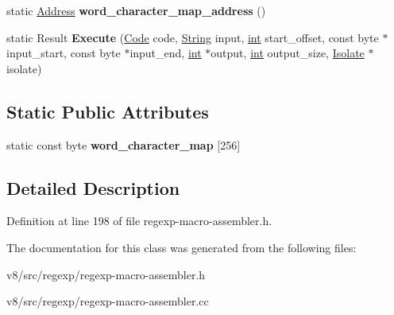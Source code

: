 \begin{DoxyCompactItemize}
\item 
\mbox{\label{classv8_1_1internal_1_1NativeRegExpMacroAssembler_accf544c18ba07a35b990d2a71412a752}} 
static \mbox{\hyperlink{classuintptr__t}{Address}} {\bfseries word\+\_\+character\+\_\+map\+\_\+address} ()
\item 
\mbox{\label{classv8_1_1internal_1_1NativeRegExpMacroAssembler_af973025a5f5aee7a2da1d3cdf0feb1a1}} 
static Result {\bfseries Execute} (\mbox{\hyperlink{classv8_1_1internal_1_1Code}{Code}} code, \mbox{\hyperlink{classv8_1_1internal_1_1String}{String}} input, \mbox{\hyperlink{classint}{int}} start\+\_\+offset, const byte $\ast$input\+\_\+start, const byte $\ast$input\+\_\+end, \mbox{\hyperlink{classint}{int}} $\ast$output, \mbox{\hyperlink{classint}{int}} output\+\_\+size, \mbox{\hyperlink{classv8_1_1internal_1_1Isolate}{Isolate}} $\ast$isolate)
\end{DoxyCompactItemize}
\subsection*{Static Public Attributes}
\begin{DoxyCompactItemize}
\item 
\mbox{\label{classv8_1_1internal_1_1NativeRegExpMacroAssembler_ab96e1f9e3bc1f9938a06183c0ebf1fca}} 
static const byte {\bfseries word\+\_\+character\+\_\+map} \mbox{[}256\mbox{]}
\end{DoxyCompactItemize}


\subsection{Detailed Description}


Definition at line 198 of file regexp-\/macro-\/assembler.\+h.



The documentation for this class was generated from the following files\+:\begin{DoxyCompactItemize}
\item 
v8/src/regexp/regexp-\/macro-\/assembler.\+h\item 
v8/src/regexp/regexp-\/macro-\/assembler.\+cc\end{DoxyCompactItemize}
